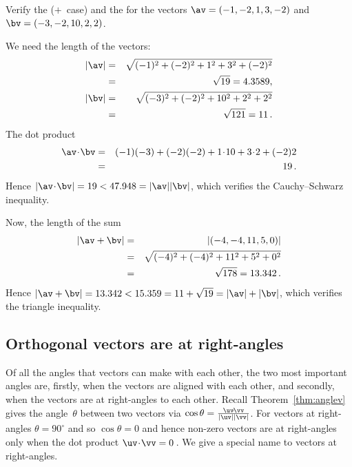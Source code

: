 \begin{example} \label{eg:}
Verify the  (\(+\)~case) and the  for the vectors \(\av=(-1,-2,1,3,-2)\) and \(\bv=(-3,-2,10,2,2)\).
\begin{solution} 
We need the length of the vectors:
\begin{eqnarray*}
|\av|&=&\sqrt{(-1)^2+(-2)^2+1^2+3^2+(-2)^2}
\\&=&\sqrt{19}=4.3589,
\\|\bv|&=&\sqrt{(-3)^2+(-2)^2+10^2+2^2+2^2}
\\&=&\sqrt{121}=11\,.
\end{eqnarray*}
The dot product
\begin{eqnarray*}
\av\cdot\bv
&=&(-1)(-3)+(-2)(-2)+1\cdot10+3\cdot2+(-2)2
\\&=&19\,.
\end{eqnarray*}
Hence \(|\av\cdot\bv|=19<47.948=|\av||\bv|\), which verifies the Cauchy--Schwarz inequality.

Now, the length of the sum
\begin{eqnarray*}
|\av+\bv|&=&|(-4,-4,11,5,0)|
\\&=&\sqrt{(-4)^2+(-4)^2+11^2+5^2+0^2}
\\&=&\sqrt{178}=13.342\,.
\end{eqnarray*}
Hence \(|\av+\bv|=13.342<15.359=11+\sqrt{19}=|\av|+|\bv|\), which verifies the triangle inequality.
\end{solution}
\end{example}








\subsection{Orthogonal vectors are at right-angles}
\label{sec:ovra}

Of all the angles that vectors can make with each other, the two most important angles are, firstly, when the vectors are aligned with each other, and secondly, when the vectors are at right-angles to each other.
Recall Theorem~\ref{thm:anglev} gives the angle~\(\theta\) between two vectors via \(\cos\theta=\frac{\uv\cdot\vv}{|\uv||\vv|}\).
For vectors at right-angles \(\theta=90^\circ\) and so \(\cos\theta=0\) and hence non-zero vectors are at right-angles only when the dot product \(\uv\cdot\vv=0\)\,.
We give a special name to vectors at right-angles.


